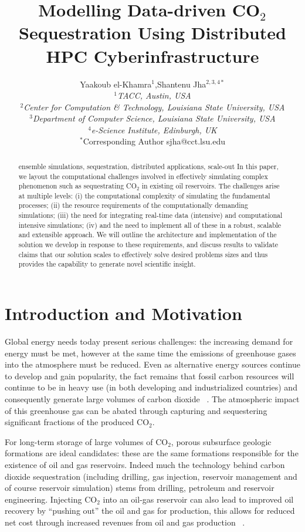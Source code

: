 \documentclass{rspublic}
\title{Modelling Data-driven CO$_{2}$ Sequestration Using Distributed HPC Cyberinfrastructure}
\author[el-khamra, jha]{Yaakoub el-Khamra$^{1}$,Shantenu Jha$^{2,3,4*}$ \\
  \small{\emph{$^{1}$TACC, Austin, USA} \\ \emph{$^{2}$Center for
      Computation \& Technology, Louisiana
      State University, USA}\\
    \emph{$^{3}$Department of Computer Science, Louisiana State University, USA}\\
    \emph{$^{4}$e-Science Institute, Edinburgh, UK}} \\
{\footnotesize {\hspace{0.0 in} $^*$Corresponding Author sjha@cct.lsu.edu}}}
\begin{document}
\maketitle

\begin{abstract}{ensemble simulations, sequestration, distributed
    applications, scale-out} In this paper, we layout the
  computational challenges involved in effectively simulating complex
  phenomenon such as sequestrating CO$_2$ in existing oil
  reservoirs. The challenges arise at multiple levels: (i) the
  computational complexity of simulating the fundamental processes;
  (ii) the resource requirements of the computationally demanding
  simulations; (iii) the need for integrating real-time data
  (intensive) and computational intensive simulations; (iv) and the
  need to implement all of these in a robust, scalable and extensible
  approach. We will outline the architecture and implementation of the
  solution we develop in response to these requirements, and discuss
  results to validate claims that our solution scales to effectively
  solve desired problems sizes and thus provides the capability to
  generate novel scientific insight.\end{abstract}

\section{Introduction and Motivation}

Global energy needs today present serious challenges: the increasing
demand for energy must be met, however at the same time the emissions
of greenhouse gases into the atmosphere must be reduced. Even as
alternative energy sources continue to develop and gain popularity,
the fact remains that fossil carbon resources will continue to be in
heavy use (in both developing and industrialized countries) and
consequently generate large volumes of carbon dioxide
~\citep{GeoRPT}. The atmospheric impact of this greenhouse gas can be
abated through capturing and sequestering significant fractions of the
produced CO$_2$.

For long-term storage of large volumes of CO$_2$, porous subsurface
geologic formations are ideal candidates: these are the same
formations responsible for the existence of oil and gas
reservoirs. Indeed much the technology behind carbon dioxide
sequestration (including drilling, gas injection, reservoir management
and of course reservoir simulation) stems from drilling, petroleum and
reservoir engineering. Injecting CO$_2$ into an oil-gas reservoir can
also lead to improved oil recovery by ``pushing out'' the oil and gas
for production, this allows for reduced net cost through increased
revenues from oil and gas production ~\citep{EORBook}.
\end{document}
